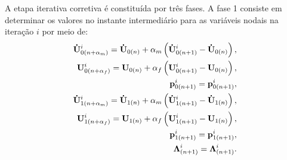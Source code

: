 A etapa iterativa corretiva é constituída por três fases. A fase 1 consiste em determinar os valores no instante intermediário para as variáveis nodais na iteração $i$ por meio de:
\begin{align}
	\mathbf{\dot{U}}_{0({n+\alpha_m})}^{i} = \mathbf{\dot{U}}_{0(n)} + \alpha_m \left( \mathbf{\dot{U}}_{0(n+1)}^{i} - \mathbf{\dot{U}}_{0(n)} \right), \label{eq:inter_acel_0}\\
	\mathbf{U}_{0(n+\alpha_f)}^{i} = \mathbf{U}_{0(n)} + \alpha_f \left( \mathbf{U}_{0(n+1)}^{i} - \mathbf{U}_{0(n)} \right), \label{eq:inter_vel_0}\\
	\mathbf{p}_{0(n+1)}^{i} = \mathbf{p}_{0(n+1)}^{i}, \label{eq:inter_press_0} \\
	\mathbf{\dot{U}}_{1(n+\alpha_m)}^{i} = \mathbf{\dot{U}}_{1(n)} + \alpha_m \left( \mathbf{\dot{U}}_{1(n+1)}^{i} - \mathbf{\dot{U}}_{1(n)} \right), \label{eq:inter_acel_1}\\
	\mathbf{U}_{1(n+\alpha_f)}^{i} = \mathbf{U}_{1(n)} + \alpha_f \left( \mathbf{U}_{1(n+1)}^{i} - \mathbf{U}_{1(n)} \right), \label{eq:inter_vel_1}\\
	\mathbf{p}_{1(n+1)}^{i} = \mathbf{p}_{1(n+1)}^{i},\label{eq:inter_press_1} \\
	\boldsymbol{\Lambda}_{(n+1)}^{i} = \boldsymbol{\Lambda}_{(n+1)}^{i}. \label{eq:inter_lag_mult}
\end{align}

